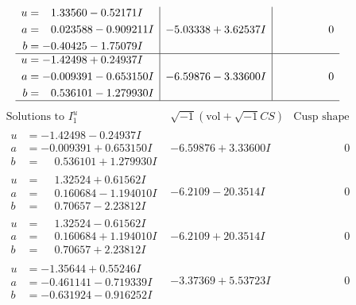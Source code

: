 \documentclass[1p]{elsarticle_modified}
\theoremstyle{definition}
\newcommand{\I}{\sqrt{-1}}
\begin{document}
$$\begin{array}{c|c|c}
\begin{aligned}
u &= \phantom{-}1.33560 - 0.52171 I \\
a &= \phantom{-}0.023588 - 0.909211 I \\
b &= -0.40425 - 1.75079 I\end{aligned}
 & -5.03338 + 3.62537 I & \phantom{-0.000000 } 0 \\ \hline\begin{aligned}
u &= -1.42498 + 0.24937 I \\
a &= -0.009391 - 0.653150 I \\
b &= \phantom{-}0.536101 - 1.279930 I\end{aligned}
 & -6.59876 - 3.33600 I & \phantom{-0.000000 } 0\\
 \hline 
 \end{array}$$\newpage$$\begin{array}{c|c|c}  
\text{Solutions to }I^u_{1}& \I (\text{vol} + \sqrt{-1}CS) & \text{Cusp shape}\\
 \hline 
\begin{aligned}
u &= -1.42498 - 0.24937 I \\
a &= -0.009391 + 0.653150 I \\
b &= \phantom{-}0.536101 + 1.279930 I\end{aligned}
 & -6.59876 + 3.33600 I & \phantom{-0.000000 } 0 \\ \hline\begin{aligned}
u &= \phantom{-}1.32524 + 0.61562 I \\
a &= \phantom{-}0.160684 - 1.194010 I \\
b &= \phantom{-}0.70657 - 2.23812 I\end{aligned}
 & -6.2109 - 20.3514 I & \phantom{-0.000000 } 0 \\ \hline\begin{aligned}
u &= \phantom{-}1.32524 - 0.61562 I \\
a &= \phantom{-}0.160684 + 1.194010 I \\
b &= \phantom{-}0.70657 + 2.23812 I\end{aligned}
 & -6.2109 + 20.3514 I & \phantom{-0.000000 } 0 \\ \hline\begin{aligned}
u &= -1.35644 + 0.55246 I \\
a &= -0.461141 - 0.719339 I \\
b &= -0.631924 - 0.916252 I\end{aligned}
 & -3.37369 + 5.53723 I & \phantom{-0.000000 } 0 \\ \hline\begin{aligned}

\end{aligned}
\end{array}$$
\end{document}

